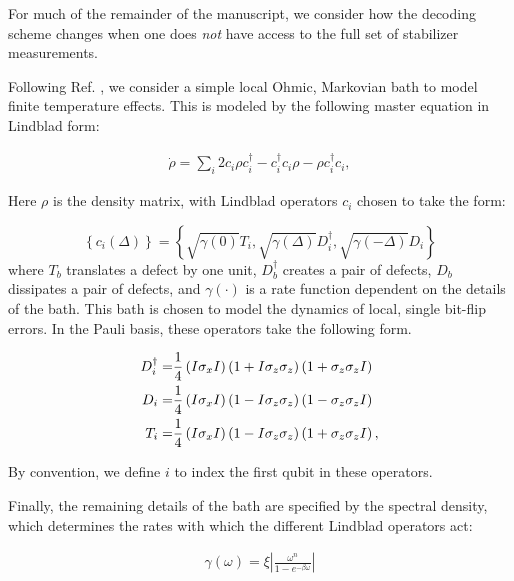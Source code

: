 \documentclass[twocolumn,superscriptaddress,aps,prb,floatfix]{revtex4-1}
\renewcommand*{\emph}[1]{{\it {#1}}}
\begin{document}
For much of the remainder of the manuscript, we consider how the decoding scheme changes when one does \emph{not} have access to the full set of stabilizer measurements.

Following Ref. \cite{Freeman2017}, we consider a simple local Ohmic, Markovian bath to model finite temperature effects.  This is modeled by the following master equation in Lindblad form:

\begin{align}
\dot{\rho }=\sum_{i}{2c_{i}\rho c^{\dagger }_i}-c^{\dagger }_{i}c_{i}\rho -\rho c^{\dagger }_{i}c_{i}, \label{eq:Lindblad}
\end{align}

Here $\rho$ is the density matrix, with Lindblad operators $c_{i}$ chosen to take the form:

\begin{equation}
\left \{ c_i (\Delta) \right \} = \left \{ \sqrt{\gamma(0)} T_{i}, \sqrt{\gamma(\Delta)} D^\dagger_{i}, \sqrt{\gamma(-\Delta)} D_{i} \right\} 
\end{equation}
where $T_{b}$ translates a defect by one unit, $D^\dagger_{b}$ creates a pair of defects, $D_{b}$ dissipates a pair of defects, and $\gamma(\cdot)$ is a rate function dependent on the details of the bath.  This bath is chosen to model the dynamics of local, single bit-flip errors.  In the Pauli basis, these operators take the following form.

\begin{align}
D^\dagger_{i}= &\frac{1}{4} \left(I \sigma_x I \right)\left(1+I \sigma_z \sigma_z\right)\left(1+ \sigma_z \sigma_z I\right) \notag \\
D_{i}= &\frac{1}{4} \left(I \sigma_x I \right)\left(1-I \sigma_z \sigma_z\right)\left(1-\sigma_z \sigma_z I\right) \notag \\
T_{i}= &\frac{1}{4} \left(I \sigma_x I \right)\left(1-I \sigma_z \sigma_z\right)\left(1+ \sigma_z \sigma_z I\right), \label{eq:LindbladDef}
\end{align}

By convention, we define $i$ to index the first qubit in these operators.

Finally, the remaining details of the bath are specified by the spectral density, which determines the rates with which the different Lindblad operators act:

\begin{align}
\gamma \left( \omega \right)=\xi \left  \vert \frac{\omega^n }{1-e^{-\beta \omega }} \right \vert \label{eq:gammadef}
\end{align}
\end{document}
